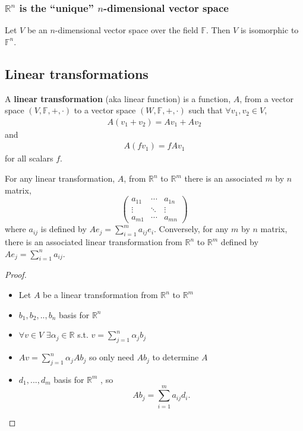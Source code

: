 \documentclass[compress]{beamer}
\def\F{\mathbb{F}}
\def\R{\mathbb{R}}
\newcommand{\gmatrix}[1]{\begin{pmatrix} {#1}_{11} & \cdots &
    {#1}_{1n} \\ \vdots & \ddots & \vdots \\ {#1}_{m1} & \cdots &
    {#1}_{mn} \end{pmatrix}}
\theoremstyle{definition}
\begin{document}
\begin{frame}\frametitle{$\R^n$ is the ``unique'' $n$-dimensional
    vector space}
  \begin{theorem}
    Let $V$ be an $n$-dimensional vector space over the field $\F$. Then
    $V$ is isomorphic to $\F^n$. 
  \end{theorem}
\end{frame}

\subsection{Linear transformations}

\begin{frame}
  \begin{definition}
    A \textbf{linear transformation} (aka linear function) is a
    function, $A$, from a vector space $(V,\F,+,\cdot)$ to a vector
    space $(W,\F,+,\cdot)$ such that $\forall v_1, v_2 \in V$,
    \begin{align*}
      A (v_1 + v_2) = A v_1 + A v_2 
    \end{align*}
    and 
    \begin{align*}
      A (f v_1) = f A v_1
    \end{align*}
    for all scalars $f$.   
  \end{definition}
\end{frame}

\begin{frame}
  \begin{theorem}
    For any linear transformation, $A$, from $\R^n$ to $\R^m$ there is an
    associated $m$ by $n$ matrix,
    \[ 
    \gmatrix{a}
    \]
    where $a_{ij}$ is defined by $A e_j = \sum_{i=1}^m a_{ij}
    e_i$. Conversely, for any $m$ by $n$ matrix, there is an associated
    linear transformation from $\R^n$ to $\R^m$ defined by $A e_j =
    \sum_{i=1}^n a_{ij}$.
  \end{theorem}
\end{frame}

\begin{frame}
  \begin{proof}
    \begin{itemize} 
    \item Let $A$ be a linear transformation from $\R^n$ to
      $\R^m$
    \item $b_1, b_2, .., b_n$ basis for $\R^n$
    \item $\forall v \in V$ $\exists \alpha_j\in \R$ s.t. $v = \sum_{j=1}^n
      \alpha_j b_j$ 
    \item $A v = \sum_{j=1}^n \alpha_j A b_j$ so only need $A b_j$ to
      determine $A$
    \item $d_1, ..., d_m $ basis for $\R^m$ , so 
      \[
      A b_j = \sum_{i=1}^m a_{ij} d_i.
      \]
    \end{itemize}
  \end{proof}
\end{frame}
\end{document}
